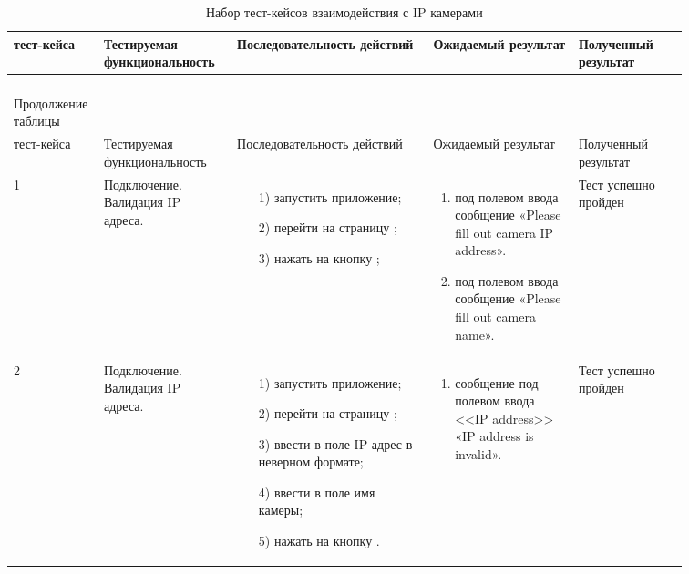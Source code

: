 \begin{longtable}{| >{\raggedright}m{0.06\linewidth} 
                  | >{\raggedright}m{0.18\linewidth} 
                  | >{\raggedright}m{0.27\linewidth} 
                  | >{\raggedright}m{0.2\linewidth} 
                  | >{\raggedright\arraybackslash}m{0.15\linewidth}|}
   \caption{Набор тест-кейсов взаимодействия с IP камерами} \label{table:testing:ip_cameras} \\

   \hline
   \No{} тест-кейса & Тестируемая функциональность & Последовательность действий & Ожидаемый результат & Полученный результат\\
   \endfirsthead

	\multicolumn{3}{c}%
	{{ \raggedleft \tablename\ \thetable{} -- Продолжение таблицы}} \\

	\hline
   	\No{} тест-кейса & Тестируемая функциональность & Последовательность действий & Ожидаемый результат & Полученный результат\\

	\hline 
	\endhead

	\hline
	1 & Подключение. Валидация IP адреса. &
   			\begin{enumerate}
				\item[1)] запустить приложение;
				\item[2)] перейти на страницу \addCameraPage{};
				\item[3)] нажать на кнопку \connectButton{};
			\end{enumerate}
   			& 
   			\begin{enumerate}
   				\item под полевом ввода \ipInput{} сообщение «Please fill out camera IP address».
   				\item под полевом ввода \nameInput{} сообщение «Please fill out camera name».
   			\end{enumerate}
   			& Тест успешно пройден \\
	\hline
	2 & Подключение. Валидация IP адреса. & 
   			\begin{enumerate}
				\item[1)] запустить приложение;
				\item[2)] перейти на страницу \addCameraPage{};
				\item[3)] ввести в поле \nameInput{} IP адрес в неверном формате;
				\item[4)] ввести в поле \ipInput{} имя камеры;
				\item[5)] нажать на кнопку \connectButton{}.
			\end{enumerate}
   			& 
   			\begin{enumerate}
   				\item сообщение под полевом ввода <<IP address>> «IP address is invalid».
   			\end{enumerate}
   			& Тест успешно пройден \\ 


\end{longtable}
